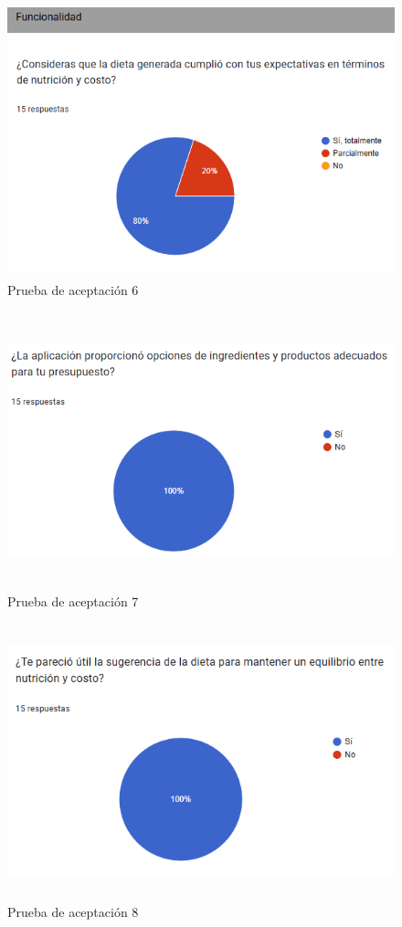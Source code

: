 \begin{figure}[H]
    \centering
    \includegraphics[height=8cm]{img/validacion/aceptacion6.png}
    \caption{Prueba de aceptaci\'on 6}
    \label{fig:aceptacion6}
\end{figure}

\begin{figure}[H]
    \centering
    \includegraphics[height=8cm]{img/validacion/aceptacion7.png}
    \caption{Prueba de aceptaci\'on 7}
    \label{fig:aceptacion7}
\end{figure}

\begin{figure}[H]
    \centering
    \includegraphics[height=8cm]{img/validacion/aceptacion8.png}
    \caption{Prueba de aceptaci\'on 8}
    \label{fig:aceptacion8}
\end{figure}

